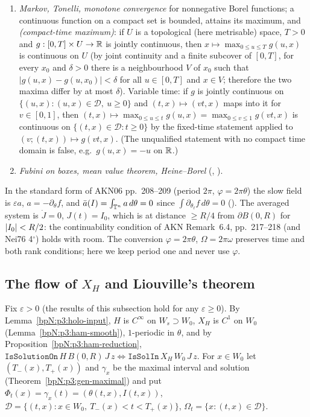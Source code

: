 \begin{enumerate}[label=(X\arabic*),leftmargin=2.2em]
\item\label{bpN:p12:ext-markov} \emph{Markov, Tonelli, monotone convergence} for nonnegative Borel functions; a continuous function on a compact set is bounded, attains its maximum, and \emph{(compact-time maximum)}: if $U$ is a topological (here metrisable) space, $T>0$ and $g:[0,T]\times U\to\mathbb{R}$ is jointly continuous, then $x\mapsto\max_{0\le u\le T}g(u,x)$ is continuous on $U$ (by joint continuity and a finite subcover of $[0,T]$, for every $x_0$ and $\delta>0$ there is a neighbourhood $V$ of $x_0$ such that $|g(u,x)-g(u,x_0)|<\delta$ for all $u\in[0,T]$ and $x\in V$; therefore the two maxima differ by at most $\delta$). Variable time: if $g$ is jointly continuous on $\{(u,x):(u,x)\in\mathcal D,\ u\ge0\}$ and $(t,x)\mapsto(vt,x)$ maps into it for $v\in[0,1]$, then $(t,x)\mapsto\max_{0\le u\le t}g(u,x)=\max_{0\le v\le1}g(vt,x)$ is continuous on $\{(t,x)\in\mathcal D:t\ge0\}$ by the fixed-time statement applied to $(v;(t,x))\mapsto g(vt,x)$. (The unqualified statement with no compact time domain is false, e.g.\ $g(u,x)=-u$ on $\mathbb{R}$.)
\item\label{bpN:p12:ext-geom} \emph{Fubini on boxes, mean value theorem, Heine--Borel} (, ).
\end{enumerate}

\begin{remark}\label{bpN:p12:averaged}
In the standard form of AKN06 pp.~208--209 (period $2\pi$, $\varphi=2\pi\theta$) the slow field is $\varepsilon a$, $a=-\partial_\theta f$, and $\bar a(I)=\int_{\mathbb{T}^n}a\,d\theta=0$ since $\int\partial_{\theta_\ell}f\,d\theta=0$ (). The averaged system is $\dot J=0$, $J(t)=I_0$, which is at distance $\ge R/4$ from $\partial B(0,R)$ for $\lvert I_0\rvert<R/2$: the continuability condition of AKN Remark~6.4, pp.~217--218 (and Nei76 4$^\circ$) holds with room. The conversion $\varphi=2\pi\theta$, $\Omega=2\pi\omega$ preserves time and both rank conditions; here we keep period one and never use $\varphi$.
\end{remark}

\subsection{The flow of $X_H$ and Liouville's theorem}\label{bpN:p12:s-flow}

Fix $\varepsilon>0$ (the results of this subsection hold for any $\varepsilon\ge0$). By Lemma~\ref{bpN:p3:holo-input}, $H$ is $C^\infty$ on $W_s\supset W_0$, $X_H$ is $C^1$ on $W_0$ (Lemma~\ref{bpN:p3:ham-smooth}), $1$-periodic in $\theta$, and by Proposition~\ref{bpN:p3:ham-reduction}, $\texttt{IsSolutionOn}\,H\,B(0,R)\,J\,z\iff\texttt{IsSolIn}\,X_H\,W_0\,J\,z$. For $x\in W_0$ let $(T_-(x),T_+(x))$ and $\gamma_x$ be the maximal interval and solution (Theorem~\ref{bpN:p3:gen-maximal}) and put $\Phi_t(x)=\gamma_x(t)=(\theta(t,x),I(t,x))$, $\mathcal D=\{(t,x):x\in W_0,\ T_-(x)<t<T_+(x)\}$, $\Omega_t=\{x:(t,x)\in\mathcal D\}$.

